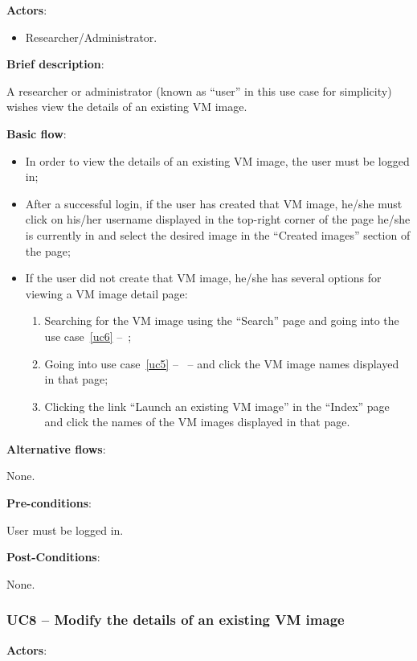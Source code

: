 \textbf{Actors}:

\begin{itemize}
\item Researcher/Administrator.
\end{itemize}

\textbf{Brief description}:

A researcher or administrator (known as ``user'' in this use case for simplicity) wishes view the details of an existing VM image. 

\textbf{Basic flow}:

\begin{itemize}
\item In order to view the details of an existing VM image, the user must be logged in;
\item After a successful login,  if the user has created that VM image, he/she must click on his/her username displayed in the top-right corner of the page he/she is currently in and select the desired image in the ``Created images'' section of the page;
\item If the user did not create that VM image, he/she has several options for viewing a VM image detail page:
	\begin{enumerate}
	\item Searching for the VM image using the ``Search'' page and going into the use case~\ref{uc6} --~;
	\item Going into use case~\ref{uc5} --~ -- and click the VM image names displayed in that page;
	\item Clicking the link ``Launch an existing VM image'' in the ``Index'' page and click the names of the VM images displayed in that page.
	\end{enumerate}
\end{itemize}

\textbf{Alternative flows}:

None.

\textbf{Pre-conditions}:

User must be logged in.

\textbf{Post-Conditions}:

None.

\subsubsection{UC8 -- Modify the details of an existing VM image}\label{uc8}

\textbf{Actors}:

